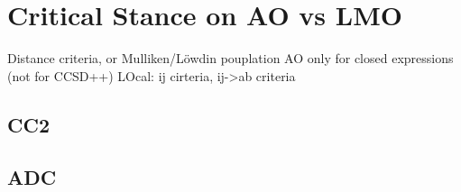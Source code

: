 




\section{Critical Stance on AO vs LMO} 

Distance criteria, or Mulliken/Löwdin pouplation
AO only for closed expressions (not for CCSD++) 
LOcal: ij cirteria, ij->ab criteria %

\subsection{CC2}


\subsection{ADC}